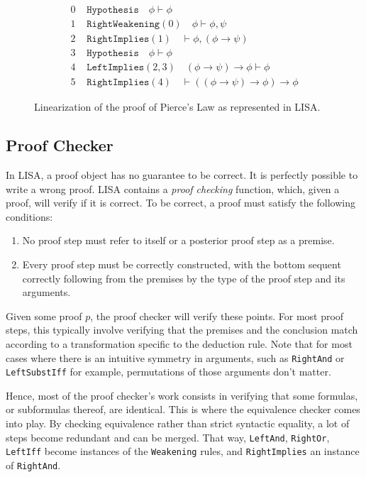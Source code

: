 \begin{figure}

\begin{equation}
\begin{split}
0 &\texttt { Hypothesis} \quad \phi \vdash \phi\\
1 &\texttt { RightWeakening}(0) \quad  \phi \vdash \phi, \psi\\
2 &\texttt { RightImplies}(1) \quad  \vdash \phi, (\phi \to \psi)\\
3 &\texttt { Hypothesis} \quad \phi \vdash \phi\\
4 &\texttt { LeftImplies}(2,3) \quad (\phi \to \psi) \to \phi \vdash \phi\\
5 &\texttt { RightImplies}(4) \quad \vdash ((\phi \to \psi) \to \phi) \to \phi
\end{split}
\end{equation}
    \caption{Linearization of the proof of Pierce's Law as represented in LISA.}
    \label{fig:exampleProofLinear}
\end{figure}

\subsection{Proof Checker}
\label{subs:proofchecker}

In LISA, a proof object has no guarantee to be correct. It is perfectly possible to write a wrong proof. LISA contains a \textit{proof checking} function, which, given a proof, will verify if it is correct. To be correct, a proof must satisfy the following conditions:
\begin{enumerate}
    \item No proof step must refer to itself or a posterior proof step as a premise.
    \item Every proof step must be correctly constructed, with the bottom sequent correctly following from the premises by the type of the proof step and its arguments.
\end{enumerate}

Given some proof $p$, the proof checker will verify these points. For most proof steps, this typically involve verifying that the premises and the conclusion match according to a transformation specific to the deduction rule. Note that for most cases where there is an intuitive symmetry in arguments, such as \texttt{RightAnd} or \texttt{LeftSubstIff} for example, permutations of those arguments don't matter.

Hence, most of the proof checker's work consists in verifying that some formulas, or subformulas thereof, are identical. This is where the equivalence checker comes into play. By checking equivalence rather than strict syntactic equality, a lot of steps become redundant and can be merged. That way, \texttt{LeftAnd}, \texttt{RightOr}, \texttt{LeftIff} become instances of the \texttt{Weakening} rules, and \texttt{RightImplies} an instance of \texttt{RightAnd}. 


